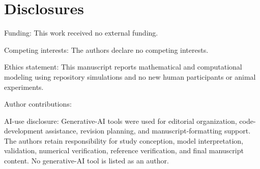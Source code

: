 \section*{Disclosures}

Funding: This work received no external funding.

Competing interests: The authors declare no competing interests.

Ethics statement: This manuscript reports mathematical and computational modeling using repository simulations and no new human participants or animal experiments.

Author contributions: \spineauthorcontributions

AI-use disclosure: Generative-AI tools were used for editorial organization, code-development assistance, revision planning, and manuscript-formatting support. The authors retain responsibility for study conception, model interpretation, validation, numerical verification, reference verification, and final manuscript content. No generative-AI tool is listed as an author.
